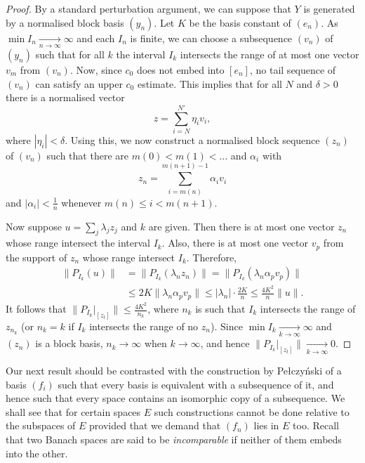 \documentclass[10pt]{amsart}
\numberwithin{equation}{section}
\begin{document}
\begin{proof}
By a standard perturbation argument, we can suppose that $Y$ is generated by a
normalised block basis $(y_n)$. Let $K$ be the basis constant of $(e_n)$. As
$\min I_n{\mathop{\longrightarrow}\limits_{{n{\rightarrow} \infty}}}\infty$ and each $I_n$ is finite, we can choose a
subsequence $(v_n)$ of $(y_n)$ such that for all $k$ the interval $I_k$
intersects the range of at most one vector $v_m$ from $(v_n)$. Now, since $c_0$
does not embed into $[e_n]$, no tail sequence of $(v_n)$ can satisfy an upper
$c_0$ estimate. This implies that for all $N$ and $\delta>0$ there is a
normalised vector
$$
z=\sum_{i=N}^{N'}\eta_iv_i,
$$
where $|\eta_i|<\delta$. Using this, we now construct a normalised block
sequence $(z_n)$ of $(v_n)$ such that  there are $m(0)<m(1)<\ldots$ and
$\alpha_i$ with
$$
z_n=\sum_{i=m(n)}^{m(n+1)-1}\alpha_iv_i
$$
and $|\alpha_i|<\frac 1n$ whenever $m(n){\ensuremath{\leqslant}} i <m(n+1)$.

Now suppose $u=\sum_j\lambda_jz_j$ and $k$ are given. Then there is at most one
vector $z_n$ whose range intersect the interval $I_k$. Also, there is  at most
one vector $v_p$ from the support of $z_n$ whose range intersect $I_k$.
Therefore,
\begin{displaymath}\begin{split}
\|P_{I_k}(u)\|&=\|P_{I_k}(\lambda_nz_n)\|= \|P_{I_k}(\lambda_n\alpha_pv_p)\|\\
&{\ensuremath{\leqslant}} 2K\|\lambda_n\alpha_pv_p\|{\ensuremath{\leqslant}} |\lambda_n|\cdot\frac {2K}n{\ensuremath{\leqslant}} \frac {4K^2}n \|u\|.
\end{split}\end{displaymath}
It follows that $\|P_{I_k}|_{[z_l]}\|{\ensuremath{\leqslant}} \frac{4K^2}{n_k}$, where $n_k$ is
such that $I_k$ intersects the range of $z_{n_k}$ (or $n_k=k$ if $I_k$
intersects the range of no $z_n$). Since $\min I_k{\mathop{\longrightarrow}\limits_{{k{\rightarrow} \infty}}}\infty$ and
$(z_n)$ is a block basis, $n_k{\rightarrow} \infty$ when $k{\rightarrow} \infty$, and hence
$\|P_{I_k}|_{[z_l]}\|{\mathop{\longrightarrow}\limits_{{k{\rightarrow} \infty}}} 0$.
\end{proof}
Our next result should be contrasted with the construction by Pe\l czy\'nski
\cite{pe} of a basis $(f_i)$ such that every basis is equivalent with a
subsequence of it, and hence such that every space contains an isomorphic copy
of a subsequence. We shall see that for certain spaces $E$ such constructions
cannot be done relative to the subspaces of $E$ provided that we demand that
$(f_n)$ lies in $E$ too. Recall that two Banach spaces are said to be {\em
incomparable} if  neither of them embeds into the other.
\end{document}
